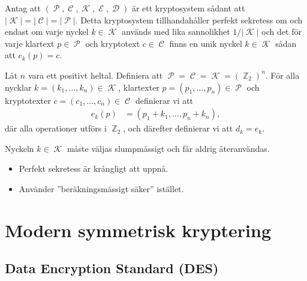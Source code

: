 \documentclass{beamer}
\theoremstyle{definition}
\DeclareMathOperator{\p}{\mathcal{P}}
\let\P\p
\DeclareMathOperator{\C}{\mathcal{C}}
\DeclareMathOperator{\K}{\mathcal{K}}
\DeclareMathOperator{\E}{\mathcal{E}}
\DeclareMathOperator{\D}{\mathcal{D}}
\DeclareMathOperator{\Z}{\mathbb{Z}}
\let\stoch\mathbf
\renewcommand{\p}{\stoch P}
\begin{document}
\begin{frame}{\insertsubsectionhead}
  \begin{theorem}\label{thm:perfectSecrecy}
    Antag att \((\P, \C, \K, \E, \D)\) är ett kryptosystem sådant att \(|\K| 
    = |\C| = |\P|\).
    Detta kryptosystem tillhandahåller perfekt sekretess om och endast om
    varje nyckel \(k\in \K\) används med lika sannolikhet \(1/|\K|\) och det 
    för varje klartext \(p\in \P\) och kryptotext \(c\in \C\) finns en unik 
    nyckel \(k\in \K\) sådan att \(e_k(p) = c\).
  \end{theorem}
\end{frame}

\begin{frame}{\insertsubsectionhead}
  \begin{definition}
    Låt \(n\) vara ett positivt heltal.
    Definiera att \(\P = \C = \K = (\Z_2)^n\).
    För alla nycklar \(k = (k_1,\ldots,k_n)\in \K\), klartexter \(p = (p_1, 
    \ldots, p_n)\in \P\) och kryptotexter \(c = (c_1,\ldots,c_n)\in \C\) 
    definierar vi att
    \begin{align}
      \nonumber
      e_k(p) &= (p_1 + k_1, \ldots, p_n + k_n),
    \end{align}
    där alla operationer utförs i \(\Z_2\), och därefter definierar vi att 
    \(d_k = e_k\).

    Nyckeln \(k\in \K\) måste väljas slumpmässigt och får aldrig återanvändas.
  \end{definition}
\end{frame}

\begin{frame}{\insertsubsectionhead}
  \begin{itemize}
    \item Perfekt sekretess är krångligt att uppnå.
    \item Använder ''beräkningsmässigt säker'' istället.
  \end{itemize}
\end{frame}


\section{Modern symmetrisk kryptering}

\subsection{Data Encryption Standard (DES)}
\end{document}
